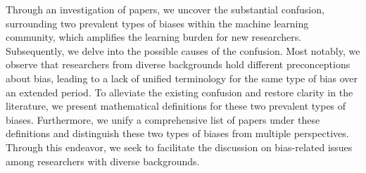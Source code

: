 \label{sec:conclusion}
Through an investigation of \pc papers, we uncover the substantial confusion, surrounding two prevalent types of biases within the machine learning community, which amplifies the learning burden for new researchers.
Subsequently, we delve into the possible causes of the confusion.
Most notably, we observe that researchers from diverse backgrounds hold different preconceptions about bias, leading to a lack of unified terminology for the same type of bias over an extended period.
To alleviate the existing confusion and restore clarity in the literature, we present mathematical definitions for these two prevalent types of biases. 
Furthermore, we unify a comprehensive list of papers under these definitions and distinguish these two types of biases from multiple perspectives.
Through this endeavor, we seek to facilitate the discussion on bias-related issues among researchers with diverse backgrounds.
